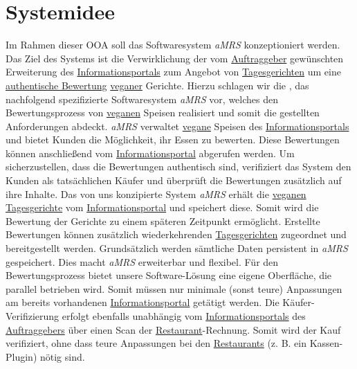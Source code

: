 \section{Systemidee}

Im Rahmen dieser \ac{OOA} soll das Softwaresystem \textit{\ac{aMRS}} konzeptioniert werden.
\newparagraph
Das Ziel des Systems ist die Verwirklichung der vom \hyperref[gls:auftraggeber]{Auftraggeber} gewünschten Erweiterung des \hyperref[gls:informationsportal]{Informationsportals} zum Angebot von \hyperref[gls:tagesgericht]{Tagesgerichten} um eine \hyperref[gls:authentischeBewertung]{authentische Bewertung} \hyperref[gls:vegan]{veganer} Gerichte.
Hierzu schlagen wir die \textit{\vFKW}, das nachfolgend spezifizierte Softwaresystem \textit{\ac{aMRS}} vor, welches den Bewertungsprozess von \hyperref[gls:vegan]{veganen} Speisen realisiert und somit die gestellten Anforderungen abdeckt.
\textit{\ac{aMRS}} verwaltet \hyperref[gls:vegan]{vegane} Speisen des \hyperref[gls:informationsportal]{Informationsportals} und bietet Kunden die Möglichkeit, ihr Essen zu bewerten.
Diese Bewertungen können anschließend vom \hyperref[gls:informationsportal]{Informationsportal} abgerufen werden.
Um sicherzustellen, dass die Bewertungen authentisch sind, verifiziert das System den Kunden als tatsächlichen Käufer und überprüft die Bewertungen zusätzlich auf ihre Inhalte.
\newparagraph
Das von uns konzipierte System \textit{\ac{aMRS}} erhält die \hyperref[gls:vegan]{veganen} \hyperref[gls:tagesgericht]{Tagesgerichte} vom \hyperref[gls:informationsportal]{Informationsportal} und speichert diese.
Somit wird die Bewertung der Gerichte zu einem späteren Zeitpunkt ermöglicht.
Erstellte Bewertungen können zusätzlich wiederkehrenden \hyperref[gls:tagesgericht]{Tagesgerichten} zugeordnet und bereitgestellt werden. Grundsätzlich werden sämtliche Daten persistent in \textit{\ac{aMRS}} gespeichert.
Dies macht \textit{\ac{aMRS}} erweiterbar und flexibel.
\newparagraph
Für den Bewertungsprozess bietet unsere Software-Lösung eine eigene Oberfläche, die parallel betrieben wird.
Somit müssen nur minimale (sonst teure) Anpassungen am bereits vorhandenen \hyperref[gls:informationsportal]{Informationsportal} getätigt werden.
Die Käufer-Verifizierung erfolgt ebenfalls unabhängig vom \hyperref[gls:informationsportal]{Informationsportals} des \hyperref[gls:auftraggeber]{Auftraggebers} über einen Scan der \hyperref[gls:restaurant]{Restaurant}-Rechnung.
Somit wird der Kauf verifiziert, ohne dass teure Anpassungen bei den \hyperref[gls:restaurant]{Restaurants} (z. B. ein Kassen-Plugin) nötig sind.

